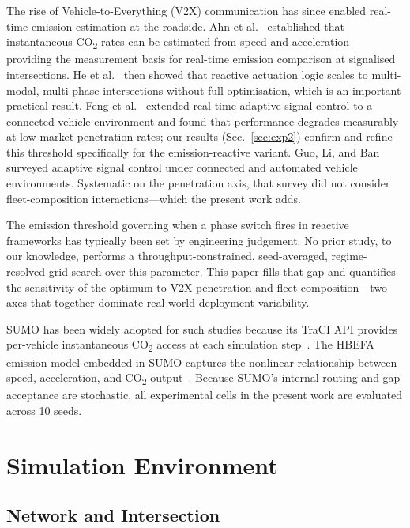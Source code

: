 \documentclass[review,3p,authoryear,times]{elsarticle}
\begin{document}
The rise of Vehicle-to-Everything (V2X) communication has since enabled
real-time emission estimation at the roadside. Ahn et al.~\cite{ahn2002}
established that instantaneous CO\textsubscript{2} rates can be estimated
from speed and acceleration---providing the measurement basis for real-time
emission comparison at signalised intersections. He et
al.~\cite{he2014multimodal} then showed that reactive actuation logic scales
to multi-modal, multi-phase intersections without full optimisation, which
is an important practical result. Feng et al.~\cite{feng2015} extended
real-time adaptive signal control to a connected-vehicle environment and
found that performance degrades measurably at low market-penetration rates;
our results (Sec.~\ref{sec:exp2}) confirm and refine this threshold
specifically for the emission-reactive variant. Guo, Li, and
Ban~\cite{guo2019survey} surveyed adaptive signal control under connected
and automated vehicle environments. Systematic on the penetration axis,
that survey did not consider fleet-composition interactions---which the
present work adds.

The emission threshold governing when a phase switch fires in reactive
frameworks has typically been set by engineering judgement. No prior study,
to our knowledge, performs a throughput-constrained, seed-averaged,
regime-resolved grid search over this parameter. This paper fills that gap
and quantifies the sensitivity of the optimum to V2X penetration and fleet
composition---two axes that together dominate real-world deployment
variability.

SUMO has been widely adopted for such studies because its TraCI API provides
per-vehicle instantaneous CO\textsubscript{2} access at each simulation
step~\cite{krajzewicz2012, Lopez2018sumo}. The HBEFA emission model embedded
in SUMO captures the nonlinear relationship between speed, acceleration, and
CO\textsubscript{2} output~\cite{behrisch2011sumo}. Because SUMO's internal
routing and gap-acceptance are stochastic, all experimental cells in the
present work are evaluated across 10 seeds.

\section{Simulation Environment}
\label{sec:sim}

\subsection{Network and Intersection}
\label{sec:network}
\end{document}
